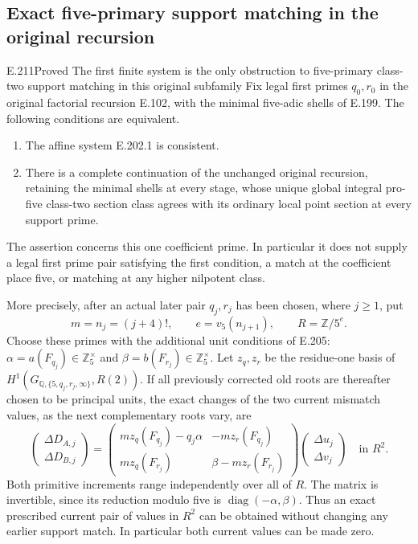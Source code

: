 \subsection{Exact five-primary support matching in the original recursion}

\begin{result}{E.211}{Proved}
{The first finite system is the only obstruction to five-primary class-two support matching in this original subfamily}
Fix legal first primes $q_0,r_0$ in the original factorial recursion
E.102, with the minimal five-adic shells of E.199. The following
conditions are equivalent.
\begin{enumerate}
\item The affine system E.202.1 is consistent.
\item There is a complete continuation of the unchanged original
recursion, retaining the minimal shells at every stage, whose unique
global integral pro-five class-two section class agrees with its
ordinary local point section at every support prime.
\end{enumerate}
The assertion concerns this one coefficient prime. In particular it
does not supply a legal first prime pair satisfying the first
condition, a match at the coefficient place five, or matching at
any higher nilpotent class.

More precisely, after an actual later pair $q_j,r_j$ has been chosen,
where $j\ge1$, put
\[
 m=n_j=(j+4)!,\qquad e=v_5(n_{j+1}),\qquad R=\mathbb Z/5^e.
\]
Choose these primes with the additional unit conditions of E.205:
$\alpha=a(F_{q_j})\in\mathbb Z_5^\times$ and
$\beta=b(F_{r_j})\in\mathbb Z_5^\times$.
Let $z_q,z_r$ be the residue-one basis of
$H^1(G_{\mathbb Q,\{5,q_j,r_j,\infty\}},R(2))$.
If all previously corrected old roots are thereafter chosen to be
principal units, the exact changes of the two current mismatch
values, as the next complementary roots vary, are
\[
 \begin{pmatrix}\Delta D_{A,j}\\\Delta D_{B,j}\end{pmatrix}
 =\begin{pmatrix}
 m z_q(F_{q_j})-q_j\alpha&-m z_r(F_{q_j})\\
 m z_q(F_{r_j})&\beta-m z_r(F_{r_j})
 \end{pmatrix}
 \begin{pmatrix}\Delta u_j\\\Delta v_j\end{pmatrix}
 \quad\text{in }R^2.
 \tag{E.211.1}
\]
Both primitive increments range independently over all of $R$.
The matrix is invertible, since its reduction modulo five is
$\operatorname{diag}(-\alpha,\beta)$.
Thus an exact prescribed current pair of values in $R^2$ can be
obtained without changing any earlier support match. In particular
both current values can be made zero.
\end{result}

